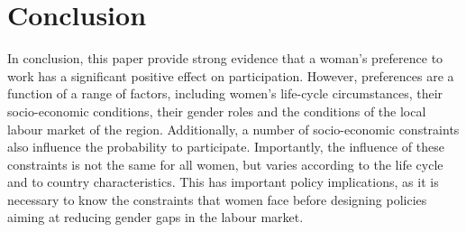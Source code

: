 \section{Conclusion}\label{sec:conclusion}

In conclusion, this paper provide strong evidence that a woman's preference to work has a significant positive effect on participation. However, preferences are a function of a range of factors, including women's life-cycle circumstances, their socio-economic conditions, their gender roles and the conditions of the local labour market of the region. Additionally, a number of socio-economic constraints also influence the probability to participate. Importantly, the influence of these constraints is not the same for all women, but varies according to the life cycle and to country characteristics. This has important policy implications, as it is necessary to know the constraints that women face before designing policies aiming at reducing gender gaps in the labour market.